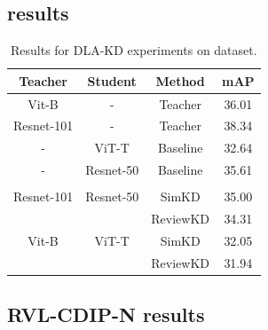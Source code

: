 \subsection{\prima{} results}\label{sec:supp-prima}

\begin{table}[h]
\centering
\caption{Results for DLA-KD experiments on \prima{} dataset.}
\label{res:prima}
\begin{tabular}{@{}cccc@{}}
\toprule
\textbf{Teacher} & \textbf{Student} & \textbf{Method} & \textbf{mAP} \\ \midrule
Vit-B            & -                & Teacher        &         36.01     \\ %
Resnet-101       & -                & Teacher        & 38.34        \\
-                & ViT-T            & Baseline        &   32.64           \\ %
-                & Resnet-50        & Baseline        & 35.61        \\
                 &                  &                 &              \\
Resnet-101       & Resnet-50        & SimKD           & 35.00           \\
                 &                  & ReviewKD        & 34.31        \\
Vit-B            & ViT-T            & SimKD           &       32.05      \\ %
                 &                  & ReviewKD        &     31.94         \\ %
                 \bottomrule
\end{tabular}
\end{table}





\subsection{RVL-CDIP-N results}\label{sec:supp-N}

